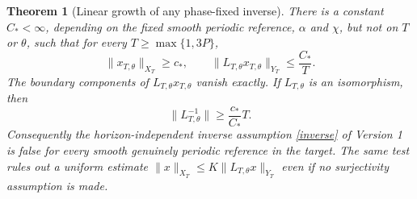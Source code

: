 \documentclass[11pt]{article}
\newtheorem{theorem}{Theorem}
\begin{document}
\begin{theorem}[Linear growth of any phase-fixed inverse]
\label{phaseobstruction}
There is a constant $C_*<\infty$, depending on the fixed smooth
periodic reference, $\alpha$ and $\chi$, but not on $T$ or $\theta$,
such that for every $T\geq\max\{1,3P\}$,
\begin{equation}\label{quasikernel}
 \|x_{T,\theta}\|_{X_T}\geq c_*,\qquad
 \|L_{T,\theta}x_{T,\theta}\|_{Y_T}\leq\frac{C_*}{T}.
\end{equation}
The boundary components of $L_{T,\theta}x_{T,\theta}$ vanish exactly.
If $L_{T,\theta}$ is an isomorphism, then
\[
 \|L_{T,\theta}^{-1}\|\geq\frac{c_*}{C_*}T.
\]
Consequently the horizon-independent inverse assumption
\eqref{inverse} of Version 1 is false for every smooth genuinely
periodic reference in the target. The same test rules out a uniform
estimate $\|x\|_{X_T}\leq K\|L_{T,\theta}x\|_{Y_T}$ even if no
surjectivity assumption is made.
\end{theorem}
\end{document}
